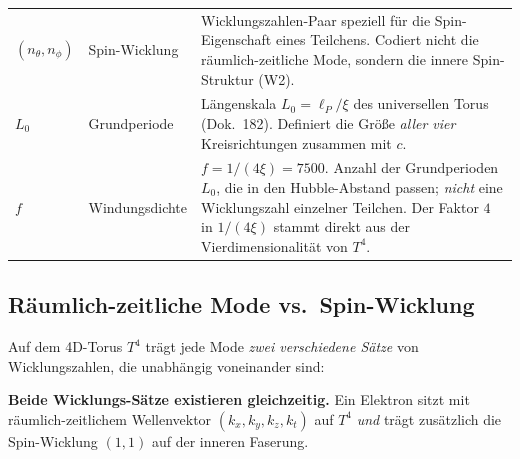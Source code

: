 \begin{center}
{{\begin{tabular}{>{\raggedright\arraybackslash}p{2.6cm}>{\raggedright\arraybackslash}p{2.8cm}>{\raggedright\arraybackslash}p{7.4cm}}
$(n_\theta, n_\phi)$ &
  Spin-Wicklung &
  Wicklungszahlen-Paar speziell für die Spin-Eigenschaft eines Teilchens. Codiert nicht die räumlich-zeitliche Mode, sondern die innere Spin-Struktur (W2). \\
$L_0$ &
  Grundperiode &
  Längenskala $L_0 = \ell_P/\xi$ des universellen Torus (Dok.~182). Definiert die Größe \emph{aller vier} Kreisrichtungen zusammen mit $c$. \\
$f$ &
  Windungsdichte &
  $f = 1/(4\xi) = 7500$. Anzahl der Grundperioden $L_0$, die in den Hubble-Abstand passen; \emph{nicht} eine Wicklungszahl einzelner Teilchen. Der Faktor $4$ in $1/(4\xi)$ stammt direkt aus der Vierdimensionalität von $T^4$. \\
\bottomrule
\end{tabular}%
}
}
\renewcommand{\arraystretch}{1.0}
\end{center}

\subsection*{Räumlich-zeitliche Mode vs.\ Spin-Wicklung}

Auf dem 4D-Torus $T^4$ trägt jede Mode \emph{zwei verschiedene
Sätze} von Wicklungszahlen, die unabhängig voneinander sind:

\begin{center}
\renewcommand{\arraystretch}{1.4}
\setlength{\tabcolsep}{8pt}
\setlength{\tabcolsep}{6pt}
\renewcommand{\arraystretch}{1.0}
\end{center}

\textbf{Beide Wicklungs-Sätze existieren gleichzeitig.} Ein
Elektron sitzt mit räumlich-zeitlichem Wellenvektor
$(k_x,k_y,k_z,k_t)$ auf $T^4$ \emph{und} trägt zusätzlich die
Spin-Wicklung $(1,1)$ auf der inneren Faserung.


